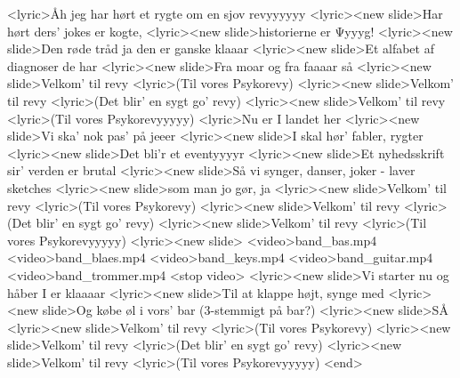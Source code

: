 <lyric>Åh jeg har hørt et rygte om en sjov revyyyyyy
<lyric><new slide>Har hørt ders’ jokes er kogte, 
<lyric><new slide>historierne er Ψyyyg!
<lyric><new slide>Den røde tråd ja den er ganske klaaar
<lyric><new slide>Et alfabet af diagnoser de har
<lyric><new slide>Fra moar og fra faaaar så
<lyric><new slide>Velkom’ til revy
<lyric>(Til vores Psykorevy)
<lyric><new slide>Velkom’ til revy
<lyric>(Det blir’ en sygt go’ revy)
<lyric><new slide>Velkom’ til revy
<lyric>(Til vores Psykorevyyyyy)
<lyric>Nu er I landet her
<lyric><new slide>Vi ska’ nok pas’ på jeeer
<lyric><new slide>I skal hør’ fabler, rygter
<lyric><new slide>Det bli’r et eventyyyyr
<lyric><new slide>Et nyhedsskrift sir’ verden er brutal
<lyric><new slide>Så vi synger, danser, joker - laver sketches 
<lyric><new slide>som man jo gør, ja
<lyric><new slide>Velkom’ til revy 
<lyric>(Til vores Psykorevy)
<lyric><new slide>Velkom’ til revy 
<lyric>(Det blir’ en sygt go’ revy)
<lyric><new slide>Velkom’ til revy 
<lyric>(Til vores Psykorevyyyyy)
<lyric><new slide>
<video>band_bas.mp4
<video>band_blaes.mp4
<video>band_keys.mp4
<video>band_guitar.mp4
<video>band_trommer.mp4
<stop video>
<lyric><new slide>Vi starter nu og håber I er klaaaar
<lyric><new slide>Til at klappe højt, synge med 
<lyric><new slide>Og købe øl i vors’ bar (3-stemmigt på bar?)
<lyric><new slide>SÅ
<lyric><new slide>Velkom’ til revy 
<lyric>(Til vores Psykorevy)
<lyric><new slide>Velkom’ til revy
<lyric>(Det blir’ en sygt go’ revy)
<lyric><new slide>Velkom’ til revy
<lyric>(Til vores Psykorevyyyyy)
<end>
